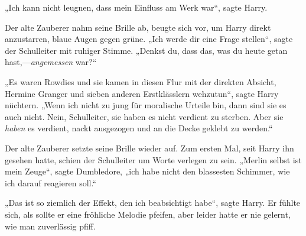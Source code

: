 „Ich kann nicht leugnen, dass mein Einfluss am Werk war“, sagte Harry.

Der alte Zauberer nahm seine Brille ab, beugte sich vor, um Harry direkt anzustarren, blaue Augen gegen grüne.
„Ich werde dir eine Frage stellen“, sagte der Schulleiter mit ruhiger Stimme.
„Denkst du, dass das, was du heute getan hast,—\emph{angemessen} war?“

„Es waren Rowdies und sie kamen in diesen Flur mit der direkten Absicht, Hermine Granger und sieben anderen Erstklässlern wehzutun“, sagte Harry nüchtern.
„Wenn ich nicht zu jung für moralische Urteile bin, dann sind sie es auch nicht. Nein, Schulleiter, sie haben es nicht verdient zu sterben. Aber sie \emph{haben} es verdient, nackt ausgezogen und an die Decke geklebt zu werden.“

Der alte Zauberer setzte seine Brille wieder auf. Zum ersten Mal, seit Harry ihn gesehen hatte, schien der Schulleiter um Worte verlegen zu sein.
„Merlin selbst ist mein Zeuge“, sagte Dumbledore, „ich habe nicht den blassesten Schimmer, wie ich darauf reagieren soll.“

„Das ist so ziemlich der Effekt, den ich beabsichtigt habe“, sagte Harry. Er fühlte sich, als sollte er eine fröhliche Melodie pfeifen, aber leider hatte er nie gelernt, wie man zuverlässig pfiff.

